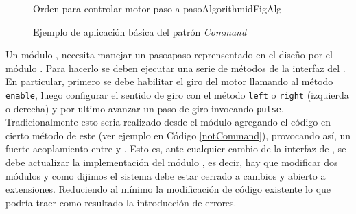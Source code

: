 \begin{figure}[H]
\caption{Ejemplo de aplicación básica del patrón \textit{Command}}
\begin{center}
\end{center}

\begin{pattern}[]{Orden para controlar motor paso a paso}{Algorithm}{idFigAlg}
\assigns
{}
\end{pattern}

\end{figure}
Un módulo \Controller, necesita manejar un \gls{pasoapaso} reprensentado en el diseño por el módulo \Motor. Para hacerlo se deben ejecutar una serie de métodos de la interfaz del \Motor. En particular, primero se debe habilitar el giro del motor llamando al método \verb|enable|, luego configurar el sentido de giro con el método \verb|left| o \verb|right| (izquierda o derecha) y por ultimo avanzar un paso de giro invocando \verb|pulse|. Tradicionalmente esto seria realizado desde el módulo \Controller agregando el código en cierto método de este (ver ejemplo en Código \ref{notCommand}), provocando así, un fuerte acoplamiento entre \Controller y \Motor. Esto es, ante cualquier cambio de la interfaz de \Motor, se debe actualizar la implementación del módulo \Controller, es decir, hay que modificar dos módulos y como dijimos el sistema debe estar cerrado a cambios y abierto a extensiones. Reduciendo al mínimo la modificación de código existente lo que podría traer como resultado la introducción de errores.


